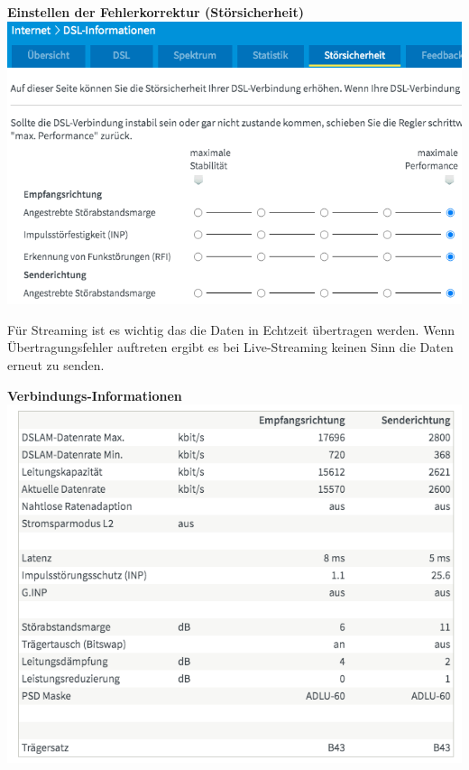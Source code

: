 {\vspace{-0.1cm}}
\begin{center}
  \textbf{Einstellen der Fehlerkorrektur (Störsicherheit)}\\
  \includegraphics[width=\textwidth]{./pictures/stoersicherheit.png}
\end{center}

\newpage

Für Streaming ist es wichtig das die Daten in Echtzeit übertragen werden.
Wenn Übertragungsfehler auftreten ergibt es bei Live-Streaming keinen Sinn die Daten erneut zu senden.


{\vspace{-0.1cm}}
\begin{center}
  \textbf{Verbindungs-Informationen}\\
  \includegraphics[scale=0.50]{./pictures/leitungsinformation.png}
\end{center}

